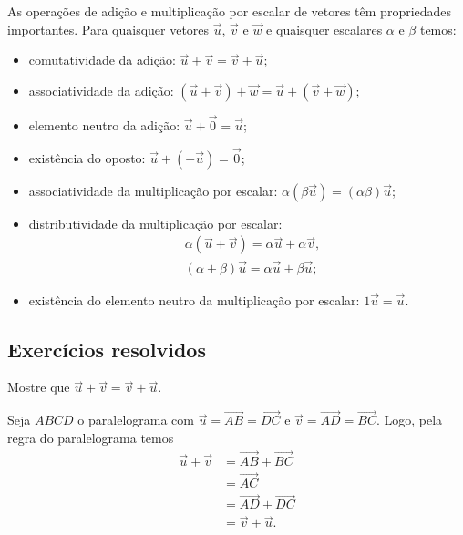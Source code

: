 As operações de adição e multiplicação por escalar de vetores têm propriedades importantes. Para quaisquer vetores $\vec{u}$, $\vec{v}$ e $\vec{w}$ e quaisquer escalares $\alpha$ e $\beta$ temos:
\begin{itemize}
\item comutatividade da adição: $\vec{u}+\vec{v}=\vec{v}+\vec{u}$;
\item associatividade da adição: $(\vec{u} + \vec{v}) + \vec{w} = \vec{u} + (\vec{v} + \vec{w})$;
\item elemento neutro da adição: $\vec{u}+\vec{0}=\vec{u}$;
\item existência do oposto: $\vec{u}+(-\vec{u}) = \vec{0}$;
\item associatividade da multiplicação por escalar: $\alpha(\beta\vec{u})=(\alpha\beta)\vec{u}$;
\item distributividade da multiplicação por escalar:
  \begin{align}
    &\alpha(\vec{u}+\vec{v}) = \alpha\vec{u}+\alpha\vec{v},\\
    &(\alpha+\beta)\vec{u} = \alpha\vec{u}+\beta\vec{u};
  \end{align}
\item existência do elemento neutro da multiplicação por escalar: $1\vec{u}=\vec{u}$.
\end{itemize}

\subsection*{Exercícios resolvidos}

\begin{exeresol}
  Mostre que $\vec{u} + \vec{v} = \vec{v} + \vec{u}$.
\end{exeresol}
\begin{resol}
  Seja $ABCD$ o paralelograma com $\vec{u} = \overrightarrow{AB} = \overrightarrow{DC}$ e $\vec{v} = \overrightarrow{AD} = \overrightarrow{BC}$. Logo, pela regra do paralelograma temos
  \begin{align}
    \vec{u} + \vec{v} &= \overrightarrow{AB} + \overrightarrow{BC} \\
                      &= \overrightarrow{AC} \\
                      &= \overrightarrow{AD} + \overrightarrow{DC} \\
                      &= \vec{v} + \vec{u}.
  \end{align}
\end{resol}

